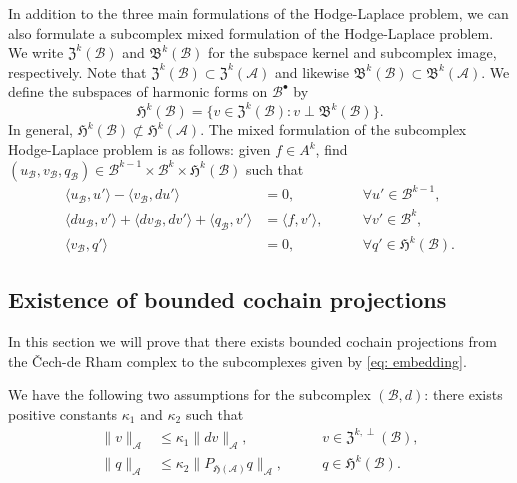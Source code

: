 \documentclass[reqno]{amsart}
\numberwithin{equation}{section}
\theoremstyle{definition}
\newcommand{\Ac}{\mathcal{A}}
\newcommand{\Bc}{\mathcal{B}}
\newcommand{\Hf}{\mathfrak{H}}
\newcommand{\Bf}{\mathfrak{B}}
\newcommand{\Zf}{\mathfrak{Z}}
\begin{document}
In addition to the three main formulations of the Hodge-Laplace problem, we can also formulate a subcomplex mixed formulation of the Hodge-Laplace problem. We write $\Zf^k(\Bc)$ and $\Bf^k(\Bc)$ for the subspace kernel and subcomplex image, respectively. Note that $\Zf^k(\Bc) \subset \Zf^k(\Ac)$ and likewise $\Bf^k(\Bc) \subset \Bf^k(\Ac)$. We define the subspaces of harmonic forms on $\Bc^\bullet$ by
\begin{equation}
\Hf^k(\Bc) = \{v \in \Zf^k(\Bc): v \perp \Bf^k(\Bc) \}.
\end{equation}
In general, $\Hf^k(\Bc) \not\subset \Hf^k(\Ac)$. The mixed formulation of the subcomplex Hodge-Laplace problem is as follows: given $f \in A^k$, find $(u_\Bc, v_\Bc, q_\Bc) \in \Bc^{k-1} \times \Bc^k \times \Hf^k(\Bc)$ such that
\begin{subequations}\label{eq: Hodge-Laplace subcomplex mixed weak}
\begin{align}
\langle u_\Bc, u' \rangle - \langle v_\Bc, du' \rangle &= 0, \qquad &\forall u' \in \Bc^{k-1}, \\
\langle du_\Bc, v' \rangle + \langle dv_\Bc, dv' \rangle + \langle q_\Bc, v' \rangle &= \langle f, v' \rangle, \qquad &\forall v' \in \Bc^k, \\
\langle v_\Bc, q' \rangle &= 0, \qquad &\forall q' \in \Hf^k(\Bc).
\end{align}
\end{subequations}



\subsection{Existence of bounded cochain projections}
In this section we will prove that there exists bounded cochain projections from the \v{C}ech-de Rham complex to the subcomplexes given by \cref{eq: embedding}.

We have the following two assumptions for the subcomplex $(\Bc, d)$: there exists positive constants $\kappa_1$ and $\kappa_2$ such that 
\begin{subequations}\label{eq: assumpions}
\begin{align}\label{eq: ass1}
\|v\|_\Ac &\leq \kappa_1 \|dv\|_\Ac, \qquad &v \in \mathfrak{Z}^{k,\perp}(\Bc), \\
\|q\|_\Ac &\leq \kappa_2 \|P_{\mathfrak{H}(\Ac)} q\|_\Ac, \qquad &q \in \Hf^k(\Bc). \label{eq: ass2}
\end{align}   
\end{subequations}
\end{document}
